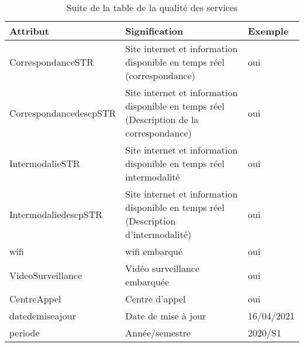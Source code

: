 	\begin{table}[H]
		\begin{center}
			\begin{tabularx}{17.5cm}{|p{4cm}|X|p{2.5cm}|}
				\hline
				\textbf{Attribut}                       & \textbf{Signification}                                                 & \textbf{Exemple} \\
				\hline
				CorrespondanceSTR                       & Site internet et information disponible en temps réel (correspondance) & oui              \\
				\hline
				CorrespondancedescpSTR                  & Site internet et information disponible en temps
				réel (Description de la correspondance) & oui                                                                                       \\
				\hline
				IntermodalieSTR                         & Site internet et information disponible en temps réel intermodalité    & oui              \\
				\hline
				IntermodaliedescpSTR                    & Site internet et information disponible en temps
				réel (Description d'intermodalité)      & oui                                                                                       \\
				\hline
				wifi                                    & wifi embarqué                                                          & oui              \\
				\hline
				VideoSurveillance                       & Vidéo surveillance embarquée                                           & oui              \\
				\hline
				CentreAppel                             & Centre d'appel                                                         & oui              \\
				\hline
				datedemiseajour                         & Date de mise à jour                                                    & 16/04/2021       \\
				\hline
				periode                                 & Année/semestre                                                         & 2020/S1          \\
				\hline
			\end{tabularx}
			\caption{Suite de la table de la qualité des services}
		\end{center}
	\end{table}

